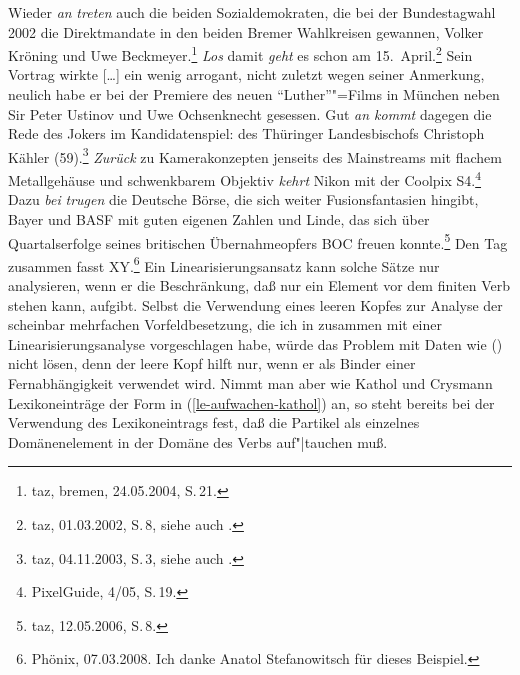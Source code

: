 Wieder \emph{an} \emph{treten} auch die beiden Sozialdemokraten, die bei der Bundestagwahl 2002 die Direktmandate in den beiden Bremer Wahlkreisen gewannen, Volker Kröning und Uwe Beckmeyer.\footnote{
  taz, bremen, 24.05.2004, S.\,21.
}
\ex\label{bsp-los-damit}
\emph{Los} damit \emph{geht} es schon am 15.\ April.\footnote{
        taz, 01.03.2002, S.\,8, siehe auch .
    }
\ex Sein Vortrag wirkte [\ldots] %
ein wenig arrogant, nicht zuletzt wegen seiner Anmerkung,
neulich habe er bei der Premiere des neuen "`Luther"'"=Films in München neben
Sir Peter Ustinov und Uwe Ochsenknecht gesessen. %
Gut \emph{an kommt} dagegen die Rede des Jokers im Kandidatenspiel: des Thüringer Landesbischofs Christoph Kähler (59).\footnote{
        taz, 04.11.2003, S.\,3, siehe auch .%
}
\ex
\emph{Zurück} zu Kamerakonzepten jenseits des Mainstreams mit flachem Metallgehäuse und schwenkbarem Objektiv \emph{kehrt} Nikon mit der
Coolpix S4.\footnote{
  PixelGuide, 4/05, S.\,19.
}
\ex Dazu \emph{bei} \emph{trugen} die Deutsche Börse, die sich weiter Fusionsfantasien hingibt, Bayer und BASF
mit guten eigenen Zahlen und Linde, das sich über Quartalserfolge seines britischen Übernahmeopfers
BOC freuen konnte.\footnote{
  taz, 12.05.2006, S.\,8. 
}
\ex Den Tag zusammen fasst XY.\footnote{
     Phönix, 07.03.2008. Ich danke Anatol Stefanowitsch für dieses
     Beispiel.
}
\zl
Ein Linearisierungsansatz kann solche Sätze nur analysieren, 
wenn er die Beschränkung, daß nur ein Element vor dem finiten Verb stehen kann, aufgibt.
Selbst die Verwendung eines leeren Kopfes zur Analyse der scheinbar mehrfachen Vorfeldbesetzung,
die ich in  zusammen mit einer Linearisierungsanalyse vorgeschlagen habe,
würde das Problem mit Daten wie () nicht lösen, denn der leere Kopf hilft nur,
wenn er als Binder einer Fernabhängigkeit verwendet wird. Nimmt man aber wie Kathol und Crysmann
Lexikoneinträge der Form in (\ref{le-aufwachen-kathol}) an, so steht bereits bei der Verwendung
des Lexikoneintrags fest, daß die Partikel als einzelnes Domänenelement in der Domäne des Verbs auf"|tauchen muß.

